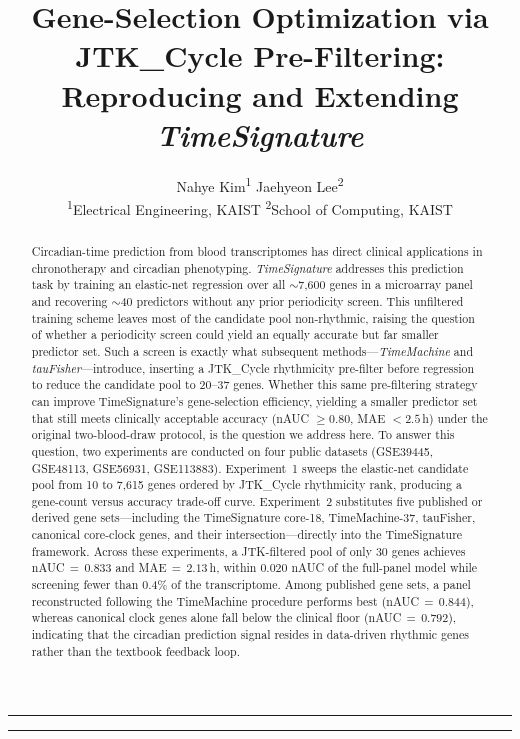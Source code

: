 \documentclass[10pt,a4paper]{article}
\title{\Large\textbf{Gene-Selection Optimization via JTK\_Cycle Pre-Filtering:}\\
       \Large\textbf{Reproducing and Extending \emph{TimeSignature}}}
\author{
  \normalsize Nahye Kim\textsuperscript{1} \quad
  Jaehyeon Lee\textsuperscript{2}\\
  {\small \textsuperscript{1}Electrical Engineering, KAIST \quad
   \textsuperscript{2}School of Computing, KAIST}\\[8pt]
}
\date{}
\begin{document}
\maketitle

\vspace{0.5em}
\noindent\rule{\linewidth}{0.4pt}
\vspace{-4pt}


\vspace{4pt}
\noindent\rule{\linewidth}{0.4pt}
\vspace{1.5em}

\begin{abstract}
Circadian-time prediction from blood transcriptomes has direct
clinical applications in chronotherapy and circadian phenotyping.
\emph{TimeSignature} addresses this prediction task by training an
elastic-net regression over all ${\sim}$7,600 genes in a microarray
panel and recovering ${\sim}$40 predictors without any prior
periodicity screen.
This unfiltered training scheme leaves most of the candidate pool
non-rhythmic, raising the question of whether a periodicity screen
could yield an equally accurate but far smaller predictor set.
Such a screen is exactly what subsequent methods---\emph{TimeMachine}
and \emph{tauFisher}---introduce, inserting a JTK\_Cycle rhythmicity
pre-filter before regression to reduce the candidate pool to
20--37 genes.
Whether this same pre-filtering strategy can improve TimeSignature's
gene-selection efficiency, yielding a smaller predictor set that still
meets clinically acceptable accuracy (nAUC $\geq 0.80$,
MAE $< 2.5$\,h) under the original two-blood-draw protocol, is the
question we address here.
To answer this question, two experiments are conducted on four public datasets
(GSE39445, GSE48113, GSE56931, GSE113883).
Experiment~1 sweeps the elastic-net candidate pool from 10 to
7,615 genes ordered by JTK\_Cycle rhythmicity rank, producing a
gene-count versus accuracy trade-off curve.
Experiment~2 substitutes five published or derived gene
sets---including the TimeSignature core-18, TimeMachine-37,
tauFisher, canonical core-clock genes, and their
intersection---directly into the TimeSignature framework.
Across these experiments, a JTK-filtered pool of only 30 genes achieves
nAUC\,${=}\,0.833$ and MAE\,${=}\,2.13$\,h, within 0.020 nAUC of
the full-panel model while screening fewer than 0.4\% of the
transcriptome.
Among published gene sets, a panel reconstructed following the
TimeMachine procedure performs best
(nAUC\,${=}\,0.844$), whereas canonical clock genes alone fall below
the clinical floor (nAUC\,${=}\,0.792$), indicating that the
circadian prediction signal resides in data-driven rhythmic genes
rather than the textbook feedback loop.
\end{abstract}
\end{document}
